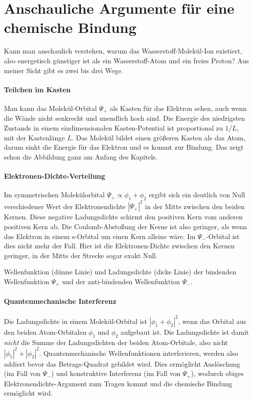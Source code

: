 \section{Anschauliche Argumente für eine chemische Bindung}

Kann man anschaulich verstehen, warum das Wasserstoff-Molekül-Ion  existiert, also energetisch günstiger ist als ein Wasserstoff-Atom und ein freies Proton? Aus meiner Sicht gibt es zwei bis drei Wege.

\paragraph{Teilchen im Kasten}  Man kann das Molekül-Orbital $\Psi_+$ als Kasten für das Elektron sehen, auch wenn die Wände nicht senkrecht und unendlich hoch sind. Die Energie des niedrigsten Zustands in einem eindimensionalen  Kasten-Potential ist proportional zu $1/L$, mit der Kastenlänge $L$. Das Molekül bildet einen größeren Kasten als das Atom, darum sinkt die Energie für das Elektron und es kommt zur Bindung. Das zeigt schon die Abbildung ganz am Anfang des Kapitels.


\paragraph{Elektronen-Dichte-Verteilung} Im symmetrischen Molekülorbital $\Psi_+ \propto \phi_1 + \phi_2$ ergibt sich ein deutlich von Null verschiedener Wert der Elektronendichte $|\Psi_+|^2$ in der Mitte zwischen den beiden Kernen. Diese negative Ladungsdichte schirmt den positiven Kern vom anderen positiven Kern ab. Die Coulomb-Abstoßung der Kerne ist also geringer, als wenn das Elektron in einem s-Orbital um einen Kern alleine  wäre. Im $\Psi_-$-Orbital ist dies nicht mehr der Fall. Hier ist die Elektronen-Dichte zwischen den Kernen geringer, in der Mitte der Strecke sogar exakt Null.
%
\begin{marginfigure}[-50mm]
\caption{ Wellenfunktion (dünne Linie) und Ladungsdichte (dicke Linie) der bindenden Wellenfunktion $\Psi_+$ und der  anti-bindenden Wellenfunktion $\Psi_-$.}
\end{marginfigure}




\paragraph{Quantenmechanische Interferenz} Die Ladungsdichte in einem Molekül-Orbital ist $| \phi_1 + \phi_2 |^2$, wenn das Orbital aus den beiden Atom-Orbitalen $\phi_1$ und $\phi_2$ aufgebaut ist. Die Ladungsdichte ist damit \emph{nicht} die Summe der Ladungsdichten der beiden Atom-Orbitale, also nicht $| \phi_1 |^2 +| \phi_2 |^2$. Quantenmechanische Wellenfunktionen interferieren, werden also addiert bevor das Betrags-Quadrat gebildet wird. Dies ermöglicht Auslöschung (im Fall von $\Psi_-$) und konstruktive Interferenz (im Fall von $\Psi_+$), wodurch obiges Elektronendichte-Argument zum Tragen kommt und  die chemische Bindung ermöglicht wird.








